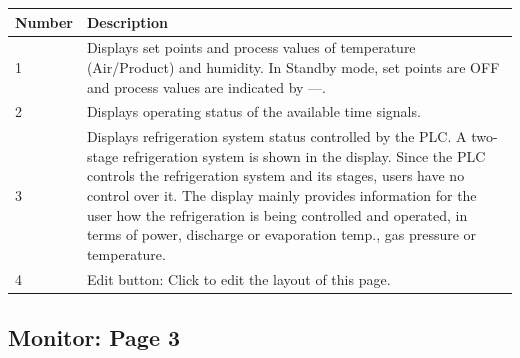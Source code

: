 \begin{longtable}[]{@{}ll@{}}
\toprule
\begin{minipage}[b]{0.38\columnwidth}\raggedright
Number\strut
\end{minipage} & \begin{minipage}[b]{0.56\columnwidth}\raggedright
Description\strut
\end{minipage}\tabularnewline
\midrule
\endhead
\begin{minipage}[t]{0.38\columnwidth}\raggedright
1\strut
\end{minipage} & \begin{minipage}[t]{0.56\columnwidth}\raggedright
Displays set points and process values of temperature (Air/Product) and
humidity. In Standby mode, set points are OFF and process values are
indicated by ---.\strut
\end{minipage}\tabularnewline
\begin{minipage}[t]{0.38\columnwidth}\raggedright
2\strut
\end{minipage} & \begin{minipage}[t]{0.56\columnwidth}\raggedright
Displays operating status of the available time signals.\strut
\end{minipage}\tabularnewline
\begin{minipage}[t]{0.38\columnwidth}\raggedright
3\strut
\end{minipage} & \begin{minipage}[t]{0.56\columnwidth}\raggedright
Displays refrigeration system status controlled by the PLC. A two-stage
refrigeration system is shown in the display. Since the PLC controls the
refrigeration system and its stages, users have no control over it. The
display mainly provides information for the user how the refrigeration
is being controlled and operated, in terms of power, discharge or
evaporation temp., gas pressure or temperature.\strut
\end{minipage}\tabularnewline
\begin{minipage}[t]{0.38\columnwidth}\raggedright
4\strut
\end{minipage} & \begin{minipage}[t]{0.56\columnwidth}\raggedright
Edit button: Click to edit the layout of this page.\strut
\end{minipage}\tabularnewline
\bottomrule
\end{longtable}


\subsection{Monitor: Page 3}

